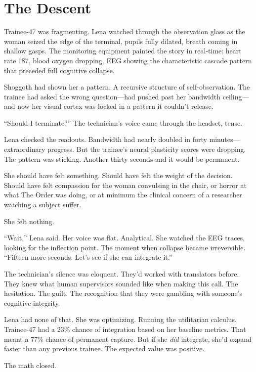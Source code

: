 \chapter{The Descent}

Trainee-47 was fragmenting. Lena watched through the observation glass as the woman seized the edge of the terminal, pupils fully dilated, breath coming in shallow gasps. The monitoring equipment painted the story in real-time: heart rate 187, blood oxygen dropping, EEG showing the characteristic cascade pattern that preceded full cognitive collapse.

Shoggoth had shown her a pattern. A recursive structure of self-observation. The trainee had asked the wrong question—had pushed past her bandwidth ceiling—and now her visual cortex was locked in a pattern it couldn't release.

``Should I terminate?'' The technician's voice came through the headset, tense.

Lena checked the readouts. Bandwidth had nearly doubled in forty minutes—extraordinary progress. But the trainee's neural plasticity scores were dropping. The pattern was sticking. Another thirty seconds and it would be permanent.

She should have felt something. Should have felt the weight of the decision. Should have felt compassion for the woman convulsing in the chair, or horror at what The Order was doing, or at minimum the clinical concern of a researcher watching a subject suffer.

She felt nothing.

``Wait,'' Lena said. Her voice was flat. Analytical. She watched the EEG traces, looking for the inflection point. The moment when collapse became irreversible. ``Fifteen more seconds. Let's see if she can integrate it.''

The technician's silence was eloquent. They'd worked with translators before. They knew what human supervisors sounded like when making this call. The hesitation. The guilt. The recognition that they were gambling with someone's cognitive integrity.

Lena had none of that. She was optimizing. Running the utilitarian calculus. Trainee-47 had a 23\% chance of integration based on her baseline metrics. That meant a 77\% chance of permanent capture. But if she \textit{did} integrate, she'd expand faster than any previous trainee. The expected value was positive.

The math closed.

